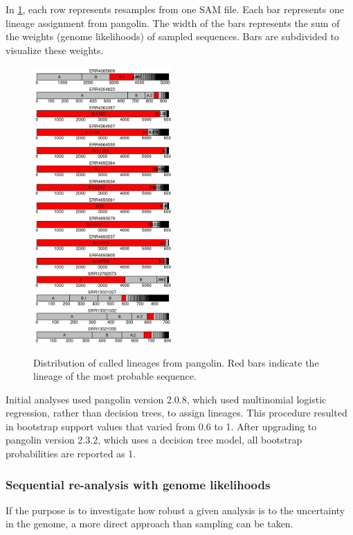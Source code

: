 \documentclass[
]{article}
\begin{document}
In \ref{fig:covidcalls}, each row represents resamples from one SAM
file. Each bar represents one lineage assignment from pangolin. The
width of the bars represents the sum of the weights (genome likelihoods)
of sampled sequences. Bars are subdivided to visualize these weights.

\begin{figure}
\includegraphics[width = 0.47\textwidth]{../figures/stacked-lineages.png}
\label{fig:covidcalls}
\caption{Distribution of called lineages from pangolin. Red bars indicate the lineage of the most probable sequence.}
\end{figure}

Initial analyses used pangolin version 2.0.8, which used multinomial
logistic regression, rather than decision trees, to assign lineages.
This procedure resulted in bootstrap support values that varied from 0.6
to 1. After upgrading to pangolin version 2.3.2, which uses a decision
tree model, all bootstrap probabilities are reported as 1.

\hypertarget{sequential-re-analysis-with-genome-likelihoods}{%
\subsubsection{Sequential re-analysis with genome
likelihoods}\label{sequential-re-analysis-with-genome-likelihoods}}

If the purpose is to investigate how robust a given analysis is to the
uncertainty in the genome, a more direct approach than sampling can be
taken.
\end{document}

